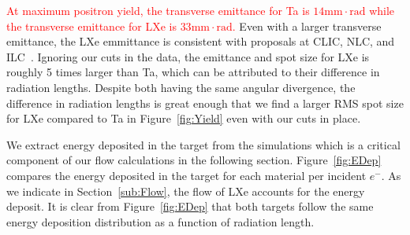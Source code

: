\documentclass[
reprint,
nofootinbib,
amsmath, amssymb,
aps,
floatfix,
]{revtex4-2}
\begin{document}
\textcolor{red}{At maximum positron yield, the transverse emittance for Ta
is $14\textrm{mm}\cdot\textrm{rad}$ while the transverse emittance for LXe is $33\textrm{mm}\cdot\textrm{rad}$.}
Even with a larger transverse emittance, the LXe emmittance is consistent with proposals at CLIC, NLC, and ILC~\cite{Tang1995, Seimiya2015, Vivoli2010}.
Ignoring our cuts in the data, the emittance and spot size for LXe is roughly 5 times larger than Ta, which can be attributed 
to their difference in radiation lengths.
Despite both having the same angular divergence, the difference in radiation lengths is great enough that we find a larger 
RMS spot size for LXe compared to Ta in Figure~\ref{fig:Yield} even with our cuts in place.


We extract energy deposited in the target from the simulations which is a critical component of our flow calculations in the following section.
Figure~\ref{fig:EDep} compares the energy deposited in the target for each material per incident $e^-$.
As we indicate in Section~\ref{sub:Flow}, the flow of LXe accounts for the energy deposit.  
It is clear from Figure~\ref{fig:EDep} that both targets follow the same energy deposition distribution as a function of radiation length.
\end{document}
